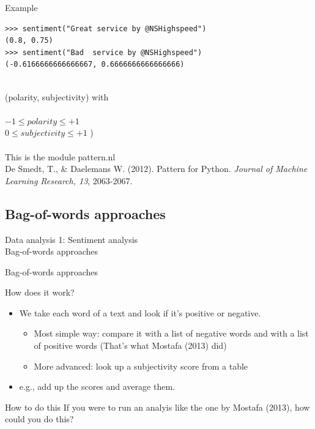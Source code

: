 \documentclass{beamer}
\begin{document}
\begin{frame}[fragile]{Example}
\begin{lstlisting}
>>> sentiment("Great service by @NSHighspeed")
(0.8, 0.75)
>>> sentiment("Bad  service by @NSHighspeed")
(-0.6166666666666667, 0.6666666666666666)
\end{lstlisting}
~\\
\footnotesize{(polarity, subjectivity) with \\ ~ \\
 $-1 \leq polarity \leq +1$\\
 $0 \leq subjectivity \leq +1$ )} \\~\\
\vskip 1cm 
\tiny{This is the module pattern.nl \\ De Smedt, T., \& Daelemans W. (2012).  Pattern for Python. \emph{Journal of Machine Learning Research, 13}, 2063-2067.\\}
\end{frame}

\subsection{Bag-of-words approaches}
\begin{frame}
Data analysis 1: Sentiment analysis\\
Bag-of-words approaches
\end{frame}


\begin{frame}{Bag-of-words approaches}
\begin{block}{How does it work?}
\begin{itemize}
\item We take each word of a text and look if it's positive or negative.
\begin{itemize}
\item<2-> Most simple way: compare it with a list of negative words and with a list of positive words {\small(That's what Mostafa (2013) did)}
\item<3-> More advanced: look up a subjectivity score from a table 
\end{itemize}
\item<4-> e.g., add up the scores and average them.
\end{itemize}
\end{block}
\end{frame}


\begin{frame}[fragile]{How to do this}
If you were to run an analyis like the one by Mostafa (2013), how could you do this?
\end{frame}
\end{document}

